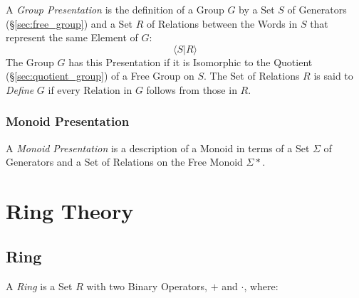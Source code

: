 A \emph{Group Presentation} is the definition of a Group $G$ by a Set
$S$ of Generators (\S\ref{sec:free_group}) and a Set $R$ of Relations
between the Words in $S$ that represent the same Element of $G$:
\[
  \langle S | R \rangle
\]
The Group $G$ has this Presentation if it is Isomorphic to the
Quotient (\S\ref{sec:quotient_group}) of a Free Group on $S$. The Set
of Relations $R$ is said to \emph{Define} $G$ if every Relation in $G$
follows from those in $R$.



\subsubsection{Monoid Presentation}\label{sec:monoid_presentation}

A \emph{Monoid Presentation} is a description of a Monoid in terms of
a Set $\Sigma$ of Generators and a Set of Relations on the Free Monoid
$\Sigma*$.



\section{Ring Theory}\label{sec:ring_theory}

\subsection{Ring}\label{sec:ring}

A \emph{Ring} is a Set $R$ with two Binary Operators, $+$ and
$\cdot$, where:

